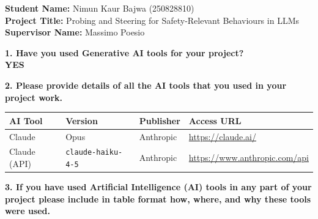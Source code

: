\documentclass[conference]{IEEEtran}
\begin{document}
\textbf{Student Name:} Nimun Kaur Bajwa (250828810)\\
\textbf{Project Title:} Probing and Steering for Safety-Relevant Behaviours in LLMs\\
\textbf{Supervisor Name:} Massimo Poesio

\textbf{1. Have you used Generative AI tools for your project?}\\
\textbf{YES}

\textbf{2. Please provide details of all the AI tools that you used in your
project work.}

\begin{tabularx}{\textwidth}{|p{3.6cm}|p{3.4cm}|p{3.4cm}|X|}
\hline
\rowcolor[gray]{0.92}
AI Tool & Version & Publisher & Access URL \\
\hline
Claude & Opus & Anthropic & \url{https://claude.ai/} \\
\hline
Claude (API) & \texttt{claude-haiku-4-5} & Anthropic & \url{https://www.anthropic.com/api} \\
\hline
\end{tabularx}

\textbf{3. If you have used Artificial Intelligence (AI) tools in any part of
your project please include in table format how, where, and why these tools
were used.}
\end{document}
